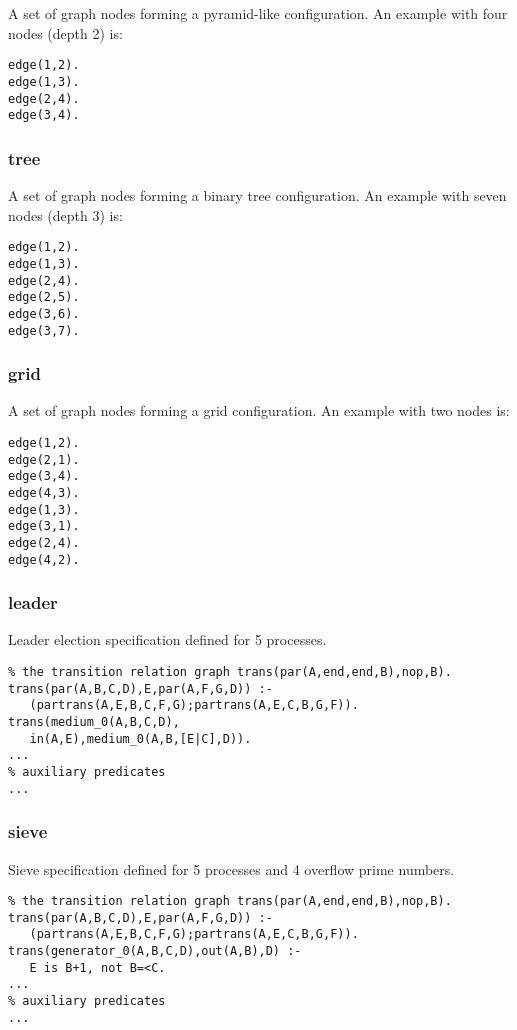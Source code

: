 A set of graph nodes forming a pyramid-like configuration.
An example with four nodes (depth 2) is:

\begin{Verbatim}
edge(1,2).
edge(1,3).
edge(2,4).
edge(3,4).
\end{Verbatim}

\subsubsection*{tree}

A set of graph nodes forming a binary tree configuration.
An example with seven nodes (depth 3) is:

\begin{Verbatim}
edge(1,2).
edge(1,3).
edge(2,4).
edge(2,5).
edge(3,6).
edge(3,7).
\end{Verbatim}

\subsubsection*{grid}

A set of graph nodes forming a grid configuration.
An example with two nodes is:

\begin{Verbatim}
edge(1,2).
edge(2,1).
edge(3,4).
edge(4,3).
edge(1,3).
edge(3,1).
edge(2,4).
edge(4,2).
\end{Verbatim}

\subsubsection*{leader}

Leader election specification defined for 5 processes.

\begin{Verbatim}
% the transition relation graph trans(par(A,end,end,B),nop,B).
trans(par(A,B,C,D),E,par(A,F,G,D)) :-
   (partrans(A,E,B,C,F,G);partrans(A,E,C,B,G,F)).
trans(medium_0(A,B,C,D),
   in(A,E),medium_0(A,B,[E|C],D)).
...
% auxiliary predicates
...
\end{Verbatim}

\subsubsection*{sieve}

Sieve specification defined for 5 processes and 4 overflow prime numbers.

\begin{Verbatim}
% the transition relation graph trans(par(A,end,end,B),nop,B).
trans(par(A,B,C,D),E,par(A,F,G,D)) :-
   (partrans(A,E,B,C,F,G);partrans(A,E,C,B,G,F)).
trans(generator_0(A,B,C,D),out(A,B),D) :-
   E is B+1, not B=<C.
...
% auxiliary predicates
...
\end{Verbatim}

